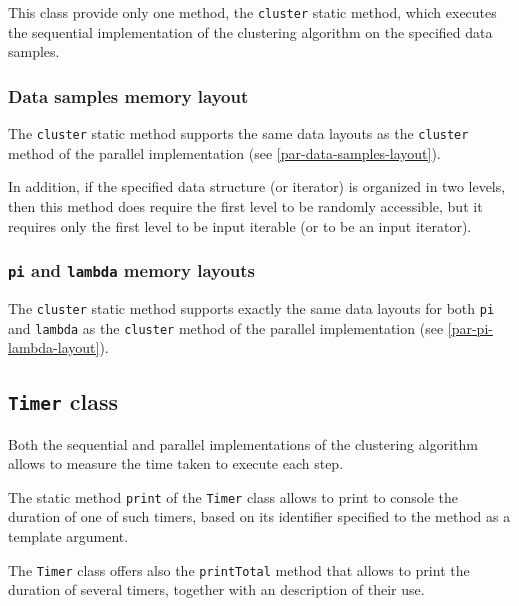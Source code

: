 \documentclass{article}
\begin{document}
This class provide only one method, the \texttt{cluster} static method, which executes the
sequential implementation of the clustering algorithm on the specified data samples.

\hypertarget{seq-data-samples-layout}{
    \subsubsection{Data samples memory layout}
    \label{seq-data-samples-layout}}

The \texttt{cluster} static method supports the same data layouts as the \texttt{cluster} method
of the parallel implementation (see \ref{par-data-samples-layout}).

In addition, if the specified data structure (or iterator) is organized in two levels, then this
method does require the first level to be randomly accessible, but it requires only the first
level to be input iterable (or to be an input iterator).

\hypertarget{seq-pi-lambda-layout}{
    \subsubsection{\texttt{pi} and \texttt{lambda} memory layouts}
    \label{seq-pi-lambda-layout}}

The \texttt{cluster} static method supports exactly the same data layouts for both \texttt{pi}
and \texttt{lambda} as the \texttt{cluster} method
of the parallel implementation (see \ref{par-pi-lambda-layout}).

\hypertarget{timers}{
    \subsection{\texttt{Timer} class}
    \label{timer}}

Both the sequential and parallel implementations of the clustering algorithm allows to measure
the time taken to execute each step.

The static method \texttt{print} of the \texttt{Timer} class allows to print to console the
duration of one of such timers, based on its identifier specified to the method as a template
argument.

The \texttt{Timer} class offers also the \texttt{printTotal} method that allows to print the
duration of several timers, together with an description of their use.
\end{document}
